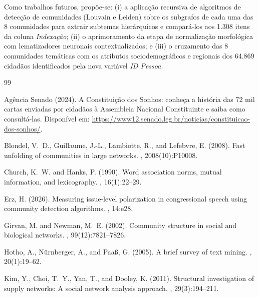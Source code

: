 \documentclass[12pt]{article}
\begin{document}
Como trabalhos futuros, propõe-se: (i) a aplicação recursiva de algoritmos de detecção de comunidades (Louvain e Leiden) sobre os subgrafos de cada uma das 8 comunidades para extrair subtemas hierárquicos e compará-los aos 1.308 itens da coluna \textit{Indexação}; (ii) o aprimoramento da etapa de normalização morfológica com lematizadores neuronais contextualizados; e (iii) o cruzamento das 8 comunidades temáticas com os atributos sociodemográficos e regionais dos 64.869 cidadãos identificados pela nova variável \textit{ID Pessoa}.


\begin{thebibliography}{99}

Agência Senado (2024).
\newblock A Constituição dos Sonhos: conheça a história das 72 mil cartas enviadas por cidadãos à Assembleia Nacional Constituinte e saiba como consultá-las.
\newblock Disponível em: \url{https://www12.senado.leg.br/noticias/constituicao-dos-sonhos/}.

Blondel, V.~D., Guillaume, J.-L., Lambiotte, R., and Lefebvre, E. (2008).
\newblock Fast unfolding of communities in large networks.
, 2008(10):P10008.

Church, K.~W. and Hanks, P. (1990).
\newblock Word association norms, mutual information, and lexicography.
, 16(1):22--29.

Erz, H. (2026).
\newblock Measuring issue-level polarization in congressional speech using community detection algorithms.
, 14:e28.

Girvan, M. and Newman, M.~E. (2002).
\newblock Community structure in social and biological networks.
, 99(12):7821--7826.

Hotho, A., Nürnberger, A., and Paa{\ss}, G. (2005).
\newblock A brief survey of text mining.
, 20(1):19--62.

Kim, Y., Choi, T.~Y., Yan, T., and Dooley, K. (2011).
\newblock Structural investigation of supply networks: A social network analysis approach.
, 29(3):194--211.


\end{thebibliography}
\end{document}
